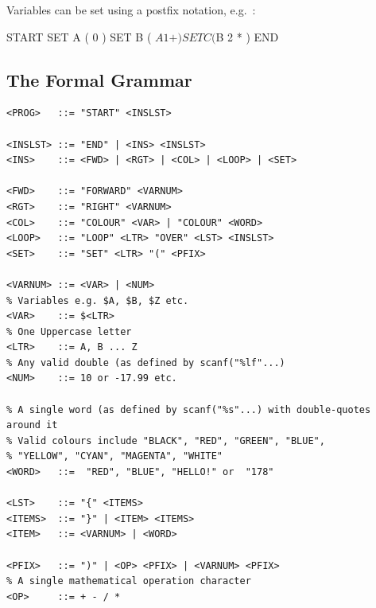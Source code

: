 \noindent Variables can be set using a postfix notation, e.g.~:
\begin{codesnippet}
START
   SET A ( 0 )
   SET B ( $A 1 + )
   SET C ( $B 2 * )
END
\end{codesnippet}

\subsection*{The Formal Grammar}
{\samepage
\begin{verbatim}
<PROG>   ::= "START" <INSLST>

<INSLST> ::= "END" | <INS> <INSLST>
<INS>    ::= <FWD> | <RGT> | <COL> | <LOOP> | <SET>

<FWD>    ::= "FORWARD" <VARNUM>
<RGT>    ::= "RIGHT" <VARNUM>
<COL>    ::= "COLOUR" <VAR> | "COLOUR" <WORD>
<LOOP>   ::= "LOOP" <LTR> "OVER" <LST> <INSLST>
<SET>    ::= "SET" <LTR> "(" <PFIX>

<VARNUM> ::= <VAR> | <NUM>
% Variables e.g. $A, $B, $Z etc.
<VAR>    ::= $<LTR>
% One Uppercase letter
<LTR>    ::= A, B ... Z
% Any valid double (as defined by scanf("%lf"...)
<NUM>    ::= 10 or -17.99 etc.

% A single word (as defined by scanf("%s"...) with double-quotes around it
% Valid colours include "BLACK", "RED", "GREEN", "BLUE",
% "YELLOW", "CYAN", "MAGENTA", "WHITE"
<WORD>   ::=  "RED", "BLUE", "HELLO!" or  "178"

<LST>    ::= "{" <ITEMS>
<ITEMS>  ::= "}" | <ITEM> <ITEMS>
<ITEM>   ::= <VARNUM> | <WORD>

<PFIX>   ::= ")" | <OP> <PFIX> | <VARNUM> <PFIX>
% A single mathematical operation character
<OP>     ::= + - / *
\end{verbatim}
}

